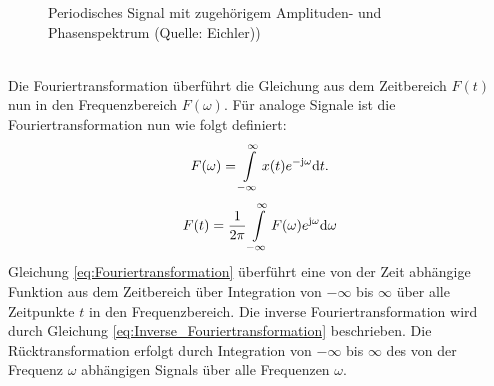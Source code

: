 \begin{figure}[!ht]
	\centering
	\hspace{5mm}
	\caption{Periodisches Signal mit zugehörigem Amplituden- und Phasenspektrum (Quelle: Eichler))}
	\label{fig.Fourier}
\end{figure}
\\
Die Fouriertransformation überführt die Gleichung aus dem Zeitbereich $F(t)$ nun in den Frequenzbereich $F(\omega)$. Für analoge Signale ist die Fouriertransformation nun wie folgt definiert:
\begin{equation}
	\label{eq:Fouriertransformation}
	F(\omega) = \int\limits_{-\infty}^{\infty} x(t) e^{\mathrm{-j\omega}} {\mathrm{d}}t.
\end{equation}
\begin{equation}
	\label{eq:Inverse_Fouriertransformation}
	F(t) = \frac{1}{2\pi}\int\limits_{-\infty}^{\infty} F(\omega)e^{\mathrm{j\omega}} {\mathrm{d}}\omega
\end{equation}
Gleichung \ref{eq:Fouriertransformation} überführt eine von der Zeit abhängige Funktion aus dem Zeitbereich über Integration von $-\infty$ bis $\infty$ über alle Zeitpunkte $t$ in den Frequenzbereich. Die inverse Fouriertransformation wird durch Gleichung \ref{eq:Inverse_Fouriertransformation} beschrieben. Die Rücktransformation erfolgt durch Integration von $-\infty$ bis $\infty$ des von der Frequenz $\omega$ abhängigen Signals über alle Frequenzen $\omega$.

